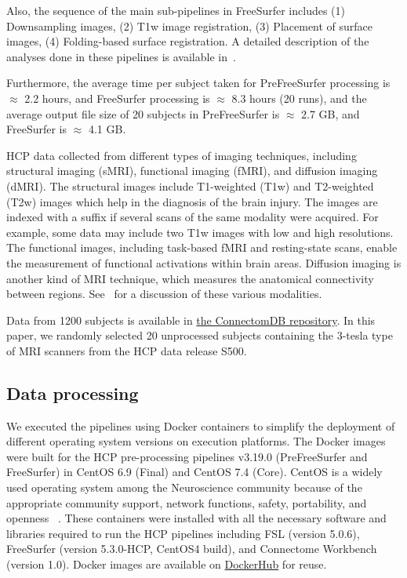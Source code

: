 \documentclass[a4paper,num-refs]{oup-contemporary}
\begin{document}
Also, the sequence of the main sub-pipelines in FreeSurfer includes 
(1) Downsampling images, 
(2) T1w image registration, 
(3) Placement of surface images, 
(4) Folding-based surface registration.
A detailed description of the analyses done in these
pipelines is available in~\cite{glasser2013}. 

Furthermore, the average time per subject taken for PreFreeSurfer processing is $\approx$ 2.2 hours, 
and FreeSurfer processing is $\approx$ 8.3 hours (20 runs), 
and the average output file size of 20 subjects in PreFreeSurfer is $\approx$ 2.7 GB, 
and FreeSurfer is $\approx$ 4.1 GB.

HCP data collected from different types of imaging techniques, including 
structural imaging (sMRI), functional imaging (fMRI), and diffusion imaging (dMRI).
The structural images include T1-weighted (T1w) and T2-weighted (T2w) images which 
help in the diagnosis of the brain injury.
The images are indexed with a suffix if several scans of the same modality were acquired.
For example, some data may include two T1w images with low and high resolutions.
The functional images, including task-based fMRI and resting-state scans, 
enable the measurement of functional activations within brain areas. 
Diffusion imaging is another kind of MRI technique, which measures 
the anatomical connectivity between regions.
See~\cite{van2013wu} for a discussion of these various modalities.

Data from 1200 subjects 
is available in \href{https://db.humanconnectome.org}{the ConnectomDB repository}. 
In this paper, we randomly selected 20 unprocessed subjects 
containing the 3-tesla type of MRI scanners from the HCP data release S500.


\subsection{Data processing}

We executed the pipelines using Docker containers to simplify the 
deployment of different operating system versions on execution 
platforms. 
The Docker images were built for the HCP pre-processing 
pipelines v3.19.0 (PreFreeSurfer and FreeSurfer) in 
CentOS 6.9 (Final) and CentOS 7.4 (Core). 
CentOS is a widely used operating system among the Neuroscience community because of 
the appropriate community support, network functions, safety, portability, and openness
~\cite{hanke2011neuroscience}.
These containers were installed with all the necessary software and libraries 
required to run the HCP pipelines including FSL (version 5.0.6), 
FreeSurfer (version 5.3.0-HCP, CentOS4 build), and Connectome Workbench (version 1.0).
Docker images are available on 
\href{https://hub.docker.com/r/bigdatalabteam/hcp-prefreesurfer/}{DockerHub}
for reuse.
\end{document}
